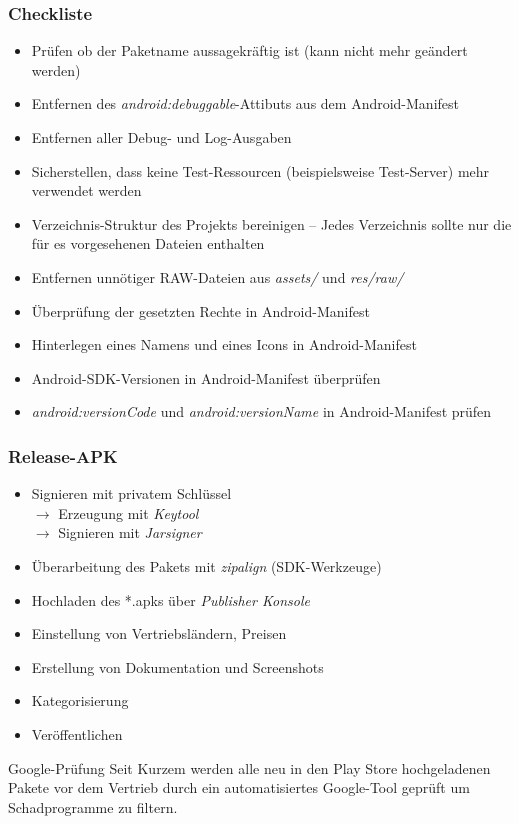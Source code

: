 \begin{frame}
	\frametitle{Checkliste}
	\begin{itemize}
		\item Prüfen ob der Paketname aussagekräftig ist (kann nicht mehr geändert werden)
		\item Entfernen des \emph{android:debuggable}-Attibuts aus dem Android-Manifest
		\item Entfernen aller Debug- und Log-Ausgaben
		\item Sicherstellen, dass keine Test-Ressourcen (beispielsweise Test-Server) 
			mehr verwendet werden
		\item Verzeichnis-Struktur des Projekts bereinigen -- Jedes Verzeichnis sollte nur die 
			für es vorgesehenen Dateien enthalten
		\item Entfernen unnötiger RAW-Dateien aus \emph{assets/} und \emph{res/raw/}
		\item Überprüfung der gesetzten Rechte in Android-Manifest
		\item Hinterlegen eines Namens und eines Icons in Android-Manifest
		\item Android-SDK-Versionen in Android-Manifest überprüfen
		\item \emph{android:versionCode} und \emph{android:versionName} in Android-Manifest prüfen
	\end{itemize}
\end{frame}

\begin{frame}
	\frametitle{Release-APK}
	\begin{itemize}
		\item Signieren mit privatem Schlüssel\\
			$\rightarrow$ Erzeugung mit \emph{Keytool}\\
			$\rightarrow$ Signieren mit \emph{Jarsigner}
		\item Überarbeitung des Pakets mit \emph{zipalign} (SDK-Werkzeuge)
		\item Hochladen des *.apks über \emph{Publisher Konsole}
		\item Einstellung von Vertriebsländern, Preisen
		\item Erstellung von Dokumentation und Screenshots
		\item Kategorisierung
		\item Veröffentlichen
	\end{itemize}
	
	\begin{alertblock}{Google-Prüfung}
		Seit Kurzem werden alle neu in den Play Store hochgeladenen Pakete vor dem 
		Vertrieb durch ein automatisiertes Google-Tool geprüft um 
		Schadprogramme zu filtern.
	\end{alertblock}
\end{frame}
